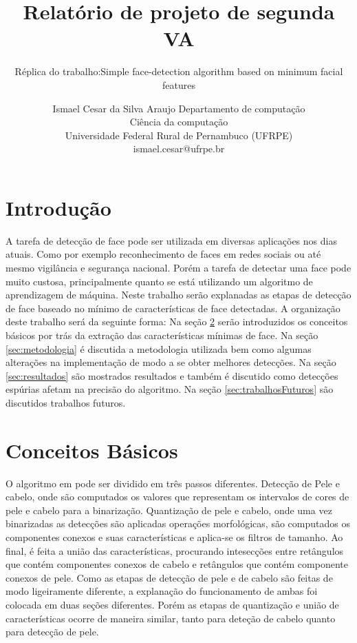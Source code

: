 \documentclass[journal,onecolumn]{IEEEtran}
\title{Relatório de projeto de segunda VA}
\subtitle{Réplica do trabalho:Simple face-detection algorithm based on minimum facial features}
\author{		Ismael Cesar da Silva Araujo
  				Departamento de computação \\
				  Ciência da computação\\
		Universidade Federal Rural de Pernambuco (UFRPE)\\
			ismael.cesar@ufrpe.br}
\date{}
\begin{document}
\maketitle

\section{Introdução}
	A tarefa de detecção de face pode ser utilizada em diversas aplicações nos dias atuais.
	Como por exemplo reconhecimento de faces em redes sociais ou até mesmo vigilância e segurança nacional.
	Porém a tarefa de detectar uma face pode muito custosa, principalmente quanto se está utilizando um algoritmo de aprendizagem de máquina.
	Neste trabalho serão explanadas as etapas de detecção de face baseado no mínimo de características de face detectadas. 
	A organização deste trabalho será da seguinte forma: Na seção \ref{sec:conceitosBasicos} serão introduzidos os conceitos básicos por trás da extração das características mínimas de face.
	Na seção \ref{sec:metodologia} é discutida a metodologia utilizada bem como algumas alterações na implementação de modo a se obter melhores detecções.
	Na seção \ref{sec:resultados} são mostrados resultados e também é discutido como detecções espúrias afetam na precisão do algoritmo.
	Na seção \ref{sec:trabalhosFuturos} são discutidos trabalhos futuros.	
\section{Conceitos Básicos}
	\label{sec:conceitosBasicos}
	O algoritmo em \cite{chen2007simple} pode ser dividido em três passos diferentes. 
	Detecção de Pele e cabelo, onde são computados os valores que representam os intervalos de cores de pele e cabelo para a binarização. 
	Quantização de pele e cabelo, onde uma vez binarizadas as detecções são aplicadas operações morfológicas, são computados os componentes conexos e suas características e aplica-se os filtros de tamanho.
	Ao final, é feita a união das características, procurando intesecções entre retângulos que contém componentes conexos de cabelo e retângulos que contém componente conexos de pele.
	Como as etapas de detecção de pele e de cabelo são feitas de modo ligeiramente diferente, a explanação do funcionamento de ambas foi colocada em duas seções diferentes.
	Porém as etapas de quantização e união de características ocorre de maneira similar, tanto para deteção de cabelo quanto para detecção de pele.
	
\end{document}
